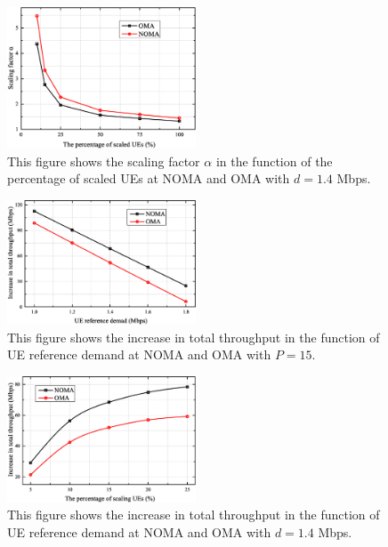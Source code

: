 \documentclass[10pt,journal,final,finalsubmission,twocolumn]{IEEEtran}
\begin{document}
\begin{figure}
\centering
\includegraphics[width=0.5\textwidth]{2.eps}
\caption{This figure shows the scaling factor $\alpha$ in the function of the percentage of scaled UEs at NOMA and OMA with $d=1.4$ Mbps.}
\label{2}
\end{figure}

\begin{figure}
\centering
\includegraphics[width=0.5\textwidth]{3.eps}
\caption{This figure shows the increase in total throughput in the function of UE reference demand at NOMA and OMA with $P = 15$.}
\label{3}
\end{figure}

\begin{figure}
\centering
\includegraphics[width=0.5\textwidth]{4.eps}
\caption{This figure shows the increase in total throughput in the function of UE reference demand at NOMA and OMA with $d = 1.4$ Mbps.}
\label{4}
\end{figure}
\end{document}
